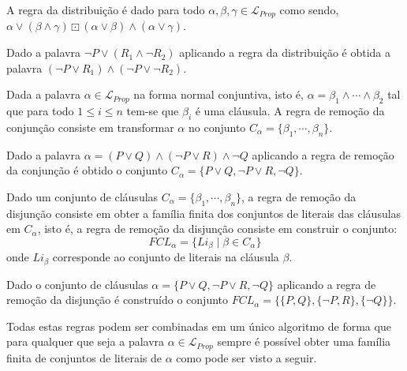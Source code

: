 \begin{definition}\label{def:RegraDaDistribuicao}
    A regra da distribuição é dado para todo $\alpha, \beta, \gamma \in \mathcal{L}_{Prop}$ como sendo, $\alpha \lor (\beta \land \gamma) \boxdot (\alpha \lor \beta) \land (\alpha \lor \gamma)$.
\end{definition}

\begin{exem}
    Dado a palavra $\neg P \lor (R_1 \land \neg R_2)$ aplicando a regra da distribuição é obtida a palavra $(\neg P \lor R_1) \land (\neg P \lor \neg R_2)$.
\end{exem}

\begin{definition}\label{def:RegraDeRemoverE}
    Dada a palavra $\alpha \in \mathcal{L}_{Prop}$ na forma normal conjuntiva, isto é, $\alpha = \beta_1 \land \cdots \land \beta_2$ tal que para todo $1 \leq i \leq n$ tem-se que $\beta_i$ é uma cláusula. A regra de remoção da conjunção consiste em transformar $\alpha$ no conjunto $C_\alpha = \{\beta_1, \cdots, \beta_n\}$. 
\end{definition}

\begin{exem}
    Dado a palavra $\alpha = (P \lor Q) \land (\neg P \lor R) \land \neg Q$ aplicando a regra de remoção da conjunção é obtido o conjunto $C_\alpha = \{P \lor Q, \neg P \lor R, \neg Q\}$.
\end{exem}

\begin{definition}\label{def:RegraDeRemoverOu}
    Dado um conjunto de cláusulas $C_\alpha = \{\beta_1, \cdots, \beta_n\}$, a regra de remoção da disjunção consiste em obter a família finita dos conjuntos de literais das cláusulas em $C_\alpha$, isto é, a regra de remoção da disjunção consiste em construir o conjunto:
    $$FCL_\alpha = \{Li_\beta \mid \beta \in C_\alpha\}$$
    onde $Li_\beta$ corresponde ao conjunto de literais na cláusula $\beta$.
\end{definition}

\begin{exem}
    Dado o conjunto de cláusulas  $\alpha = \{P \lor Q, \neg P \lor R, \neg Q\}$ aplicando a regra de remoção da disjunção é construído o conjunto $FCL_\alpha = \{\{P, Q\}, \{\neg P, R\}, \{\neg Q\}\}$.
\end{exem}

Todas estas regras podem ser combinadas em um único algoritmo de forma que para qualquer que seja a palavra $\alpha \in \mathcal{L}_{Prop}$ sempre é possível obter uma família finita de conjuntos de literais de $\alpha$ como pode ser visto a seguir.


